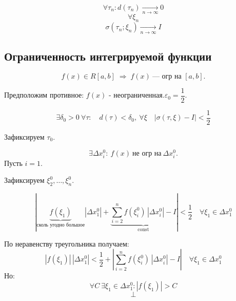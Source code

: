 \begin{definition}
    \[
        \forall \tau_n : d(\tau_n) \xrightarrow[n \to \infty ]{} 0
    \]
    \[
        \forall \xi_n
    \]
    \[
        \sigma(\tau_n; \xi_n) \xrightarrow[n\to \infty ]{} I
    \]
\end{definition}

\subsection{Ограниченность интегрируемой функции}
\begin{theorem}
    \noindent
\[
f(x)\in R[a,b]\;\Rightarrow\; f(x)\ \text{--- огр на }[a,b].
\]
\end{theorem}

\begin{Proof}
\noindent
Предположим противное: $f(x)$ - неограниченная.\quad $\varepsilon_0=\dfrac12$.

\[
\exists \delta_0>0\ \forall \tau:
\quad d(\tau)<\delta_0,\ \forall \xi \quad |\sigma(\tau,\xi)-I|<\frac12
\]

\noindent
Зафиксируем $\tau_{0}$.

\[
\exists \Delta x_i^0:\ f(x)\ \text{не огр на}\ \Delta x_i^0.
\]
Пусть $i=1$.

\noindent
Зафиксируем $\xi_2^0,\dots,\xi_n^0$.

\[
\left|
\underbrace{f(\xi_1)}_{\text{сколь угодно большое}}\!|\Delta x_1^0|
+\underbrace{\sum_{i=2}^{n} f(\xi_i^0)\,|\Delta x_i^0|-I}_{\text{const}}
\right|
<\frac12\quad
\forall \xi_1 \in \Delta x_1^{0}
\]

\noindent
По неравенству треугольника получаем:
\[
|f(\xi_1)|\,|\Delta x_1^0|
<
\frac12
+
\left|
\sum_{i=2}^{n} f(\xi_i^0)\,|\Delta x_i^0|
-I
\right| \quad
\forall \xi_1 \in \Delta x_1^{0}
\] 
Но:
\[
    \forall C\ \exists \xi_1 \in \Delta x_1^{0} : |f(\xi_1)| > C
\]
$$\bot$$


\end{Proof}
